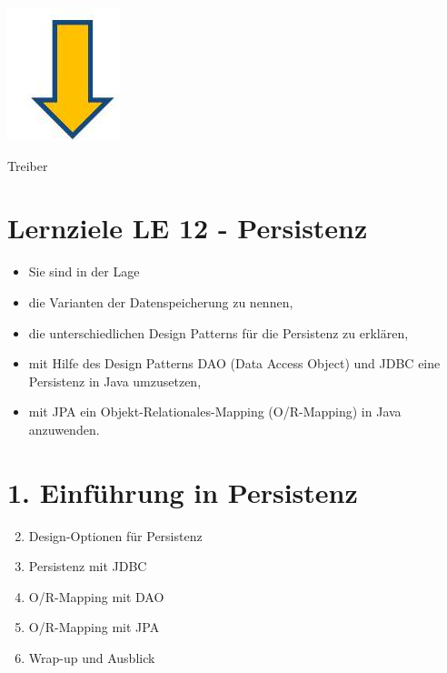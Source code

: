 \documentclass[10pt]{article}
\begin{document}
\begin{center}
\includegraphics[width=\linewidth]{images/2025_01_02_5ba1dc702e9f94ba8e06g-02}
\end{center}

Treiber

\section*{Lernziele LE 12 - Persistenz}
\begin{itemize}
  \item Sie sind in der Lage
  \item die Varianten der Datenspeicherung zu nennen,
  \item die unterschiedlichen Design Patterns für die Persistenz zu erklären,
  \item mit Hilfe des Design Patterns DAO (Data Access Object) und JDBC eine Persistenz in Java umzusetzen,
  \item mit JPA ein Objekt-Relationales-Mapping (O/R-Mapping) in Java anzuwenden.
\end{itemize}

\section*{1. Einführung in Persistenz}
\begin{enumerate}
  \setcounter{enumi}{1}
  \item Design-Optionen für Persistenz
  \item Persistenz mit JDBC
  \item O/R-Mapping mit DAO
  \item O/R-Mapping mit JPA
  \item Wrap-up und Ausblick
\end{enumerate}
\end{document}
